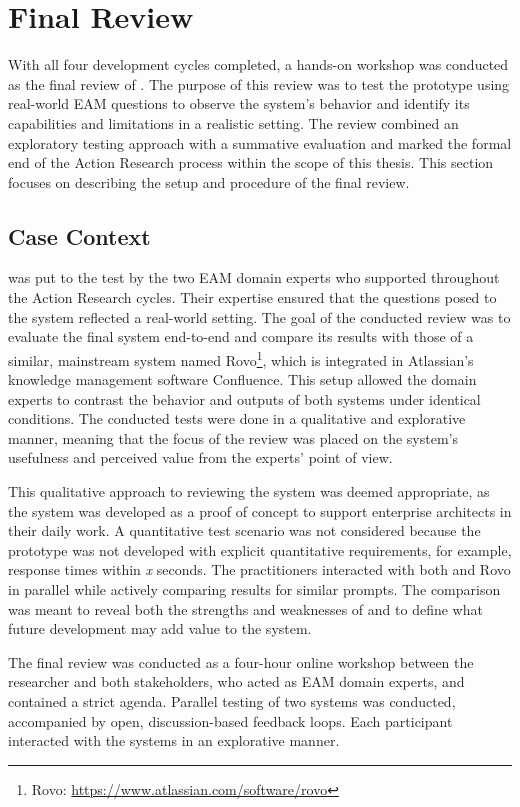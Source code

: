 \chapter{Final Review}
\label{ch:finalReview}
With all four development cycles completed, a hands-on workshop was conducted as the final review of \prototype{}. The purpose of this review was to test the prototype using real-world EAM questions to observe the system's behavior and identify its capabilities and limitations in a realistic setting. The review combined an exploratory testing approach with a summative evaluation and marked the formal end of the Action Research process within the scope of this thesis. This section focuses on describing the setup and procedure of the final review.

\section{Case Context}
\label{sec:caseContext}
\prototype{} was put to the test by the two EAM domain experts who supported throughout the Action Research cycles. Their expertise ensured that the questions posed to the system reflected a real-world setting. The goal of the conducted review was to evaluate the final system end-to-end and compare its results with those of a similar, mainstream system named Rovo\footnote{Rovo: \url{https://www.atlassian.com/software/rovo}}, which is integrated in Atlassian's knowledge management software Confluence. This setup allowed the domain experts to contrast the behavior and outputs of both systems under identical conditions. The conducted tests were done in a qualitative and explorative manner, meaning that the focus of the review was placed on the system's usefulness and perceived value from the experts' point of view.

This qualitative approach to reviewing the system was deemed appropriate, as the system was developed as a proof of concept to support enterprise architects in their daily work. A quantitative test scenario was not considered because the prototype was not developed with explicit quantitative requirements, for example, response times within \textit{x} seconds. The practitioners interacted with both \prototype{} and Rovo in parallel while actively comparing results for similar prompts. The comparison was meant to reveal both the strengths and weaknesses of \prototype{} and to define what future development may add value to the system.

The final review was conducted as a four-hour online workshop between the researcher and both stakeholders, who acted as EAM domain experts, and contained a strict agenda. Parallel testing of two systems was conducted, accompanied by open, discussion-based feedback loops. Each participant interacted with the systems in an explorative manner.

